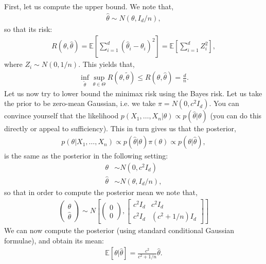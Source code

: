 \documentclass[twoside,12pt]{article}
\begin{document}
First, let us compute the upper bound. We note that,
\begin{align*}
\widehat{\theta} \sim N(\theta, I_d/n),
\end{align*}
so that its risk:
\begin{align*}
R(\theta, \widehat{\theta}) = \mathbb{E} [\sum_{i=1}^d (\widehat{\theta}_i - \theta_i)^2] =  \mathbb{E}[\sum_{i=1}^d Z_i^2],
\end{align*}
where $Z_i \sim N(0,1/n)$. This yields that,
\begin{align*}
\inf_{\widetilde{\theta}}\sup_{\theta\in\Theta}R(\theta,\widetilde{\theta}) \leq R(\theta, \widehat{\theta}) = \frac{d}{n}.
\end{align*}
Let us now try to lower bound the minimax risk using the Bayes risk. Let us take the prior to be zero-mean Gaussian, i.e. we take $\pi = N(0, c^2 I_d)$. You can convince yourself that the likelihood 
$p(X_1,\ldots,X_n | \theta) \propto p( \widehat{\theta} | \theta)$ (you can do this directly or appeal to sufficiency). This in turn gives us that the posterior,
\begin{align*}
p(\theta | X_1,\ldots,X_n) \propto  p( \widehat{\theta} | \theta) \pi(\theta) \propto p(\theta | \widehat{\theta}),
\end{align*}
is the same as the posterior in the following setting:
\begin{align*}
\theta &\sim N(0, c^2 I_d) \\
\widehat{\theta} &\sim N(\theta, I_d/n),
\end{align*}
so that in order to compute the posterior mean we note that,
\begin{align*}
\left( \begin{array}{c} \theta \\ \widehat{\theta} \end{array}\right) \sim N \left[ \left( \begin{array}{c} 0 \\ 0 \end{array}\right), \left[ \begin{array}{cc} c^2 I_d & c^2 I_d \\ c^2 I_d & (c^2 + 1/n) I_d \end{array} \right] \right]
\end{align*}
We can now compute the posterior (using standard conditional Gaussian formulae), and obtain its mean:
\begin{align*}
\mathbb{E}[\theta | \widehat{\theta} ] = \frac{c^2}{c^2 + 1/n} \widehat{\theta}.
\end{align*}
\end{document}
